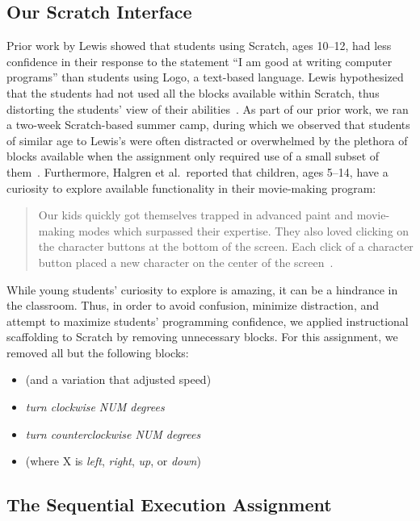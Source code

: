 \subsection{Our Scratch Interface} 
Prior work by Lewis showed that students using Scratch, ages 10--12, had less
confidence in their response to the statement ``I am good at writing computer
programs'' than students using Logo, a text-based language. Lewis hypothesized
that the students had not used all the blocks available within Scratch, thus
distorting the students' view of their
abilities~\cite{Lewis:2010:PES:1734263.1734383}. As part of our prior work, we
ran a two-week Scratch-based summer camp, during which we observed that
students of similar age to Lewis's were often distracted or overwhelmed by the
plethora of blocks available when the assignment only required use of a small
subset of them~\cite{Franklin:2013:SBO}. Furthermore, Halgren et al.\ reported
that children, ages 5--14, have a curiosity to explore available functionality
in their movie-making program:

\begin{quote}
Our kids quickly got themselves trapped in advanced paint and movie-making
modes which surpassed their expertise. They also loved clicking on the
character buttons at the bottom of the screen. Each click of a character button
placed a new character on the center of the
screen~\cite{Halgren:1995:AAM:223904.223974}.
\end{quote}

While young students' curiosity to explore is amazing, it can be a hindrance in
the classroom. Thus, in order to avoid confusion, minimize distraction, and
attempt to maximize students' programming confidence, we applied instructional
scaffolding to Scratch by removing unnecessary blocks. For this assignment, we
removed all but the following blocks:

\begin{itemize}
\item \glideDIST{} (and a variation that adjusted speed)
\item \emph{turn clockwise NUM degrees}
\item \emph{turn counterclockwise NUM degrees}
\item \pointDIR{} (where X is \emph{left}, \emph{right}, \emph{up}, or
  \emph{down})
\end{itemize}

\subsection{The Sequential Execution Assignment}


